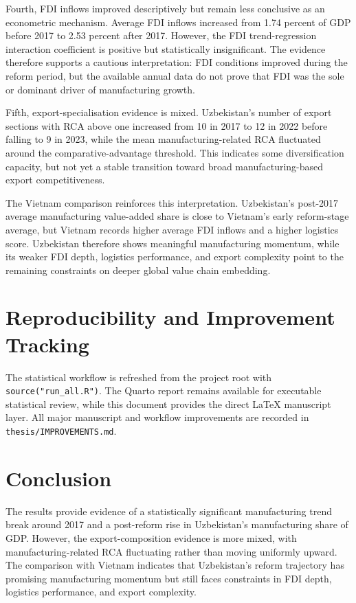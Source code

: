 \documentclass[12pt]{article}
\begin{document}
Fourth, FDI inflows improved descriptively but remain less conclusive as an econometric mechanism. Average FDI inflows increased from 1.74 percent of GDP before 2017 to 2.53 percent after 2017. However, the FDI trend-regression interaction coefficient is positive but statistically insignificant. The evidence therefore supports a cautious interpretation: FDI conditions improved during the reform period, but the available annual data do not prove that FDI was the sole or dominant driver of manufacturing growth.

Fifth, export-specialisation evidence is mixed. Uzbekistan's number of export sections with RCA above one increased from 10 in 2017 to 12 in 2022 before falling to 9 in 2023, while the mean manufacturing-related RCA fluctuated around the comparative-advantage threshold. This indicates some diversification capacity, but not yet a stable transition toward broad manufacturing-based export competitiveness.

The Vietnam comparison reinforces this interpretation. Uzbekistan's post-2017 average manufacturing value-added share is close to Vietnam's early reform-stage average, but Vietnam records higher average FDI inflows and a higher logistics score. Uzbekistan therefore shows meaningful manufacturing momentum, while its weaker FDI depth, logistics performance, and export complexity point to the remaining constraints on deeper global value chain embedding.

\section{Reproducibility and Improvement Tracking}

The statistical workflow is refreshed from the project root with \texttt{source("run\_all.R")}. The Quarto report remains available for executable statistical review, while this document provides the direct LaTeX manuscript layer. All major manuscript and workflow improvements are recorded in \texttt{thesis/IMPROVEMENTS.md}.

\section{Conclusion}

The results provide evidence of a statistically significant manufacturing trend break around 2017 and a post-reform rise in Uzbekistan's manufacturing share of GDP. However, the export-composition evidence is more mixed, with manufacturing-related RCA fluctuating rather than moving uniformly upward. The comparison with Vietnam indicates that Uzbekistan's reform trajectory has promising manufacturing momentum but still faces constraints in FDI depth, logistics performance, and export complexity.
\end{document}
